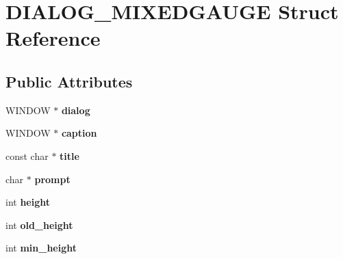 \hypertarget{struct_d_i_a_l_o_g___m_i_x_e_d_g_a_u_g_e}{}\section{D\+I\+A\+L\+O\+G\+\_\+\+M\+I\+X\+E\+D\+G\+A\+U\+GE Struct Reference}
\label{struct_d_i_a_l_o_g___m_i_x_e_d_g_a_u_g_e}
\subsection*{Public Attributes}
\begin{DoxyCompactItemize}
\item 
W\+I\+N\+D\+OW $\ast$ {\bfseries dialog}\hypertarget{struct_d_i_a_l_o_g___m_i_x_e_d_g_a_u_g_e_ae3acd4c3b23a5d0a35c89fb48836f84a}{}\label{struct_d_i_a_l_o_g___m_i_x_e_d_g_a_u_g_e_ae3acd4c3b23a5d0a35c89fb48836f84a}

\item 
W\+I\+N\+D\+OW $\ast$ {\bfseries caption}\hypertarget{struct_d_i_a_l_o_g___m_i_x_e_d_g_a_u_g_e_a7f940737eee7e013394ecc13491b53a2}{}\label{struct_d_i_a_l_o_g___m_i_x_e_d_g_a_u_g_e_a7f940737eee7e013394ecc13491b53a2}

\item 
const char $\ast$ {\bfseries title}\hypertarget{struct_d_i_a_l_o_g___m_i_x_e_d_g_a_u_g_e_a72b548d2293d95b3e9bbef1a1e327eba}{}\label{struct_d_i_a_l_o_g___m_i_x_e_d_g_a_u_g_e_a72b548d2293d95b3e9bbef1a1e327eba}

\item 
char $\ast$ {\bfseries prompt}\hypertarget{struct_d_i_a_l_o_g___m_i_x_e_d_g_a_u_g_e_a9b7beed4d587232c02c84685d6dc3b1c}{}\label{struct_d_i_a_l_o_g___m_i_x_e_d_g_a_u_g_e_a9b7beed4d587232c02c84685d6dc3b1c}

\item 
int {\bfseries height}\hypertarget{struct_d_i_a_l_o_g___m_i_x_e_d_g_a_u_g_e_acb68a640197311a0d27d7f0fc4195a96}{}\label{struct_d_i_a_l_o_g___m_i_x_e_d_g_a_u_g_e_acb68a640197311a0d27d7f0fc4195a96}

\item 
int {\bfseries old\+\_\+height}\hypertarget{struct_d_i_a_l_o_g___m_i_x_e_d_g_a_u_g_e_a755ee1541799ba5f23f876dcba453fa2}{}\label{struct_d_i_a_l_o_g___m_i_x_e_d_g_a_u_g_e_a755ee1541799ba5f23f876dcba453fa2}

\item 
int {\bfseries min\+\_\+height}\hypertarget{struct_d_i_a_l_o_g___m_i_x_e_d_g_a_u_g_e_a839949f70b6ae90839f0d2972dd80705}{}\label{struct_d_i_a_l_o_g___m_i_x_e_d_g_a_u_g_e_a839949f70b6ae90839f0d2972dd80705}


\end{DoxyCompactItemize}
